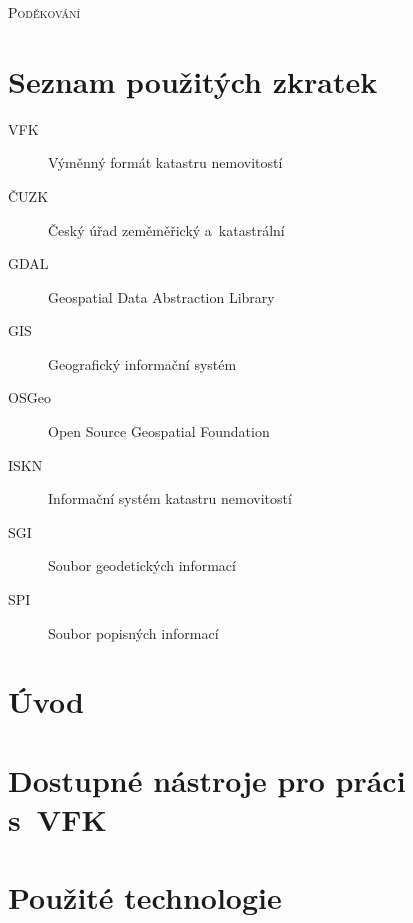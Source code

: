 \documentclass[a4paper,12pt,oneside]{book}
\begin{document}
\noindent
\textsc{\Large Poděkování}

\vspace{12pt}

\vspace{2cm}

\clearpage
\chapter*{Seznam použitých zkratek}
\thispagestyle{empty}

\begin{description}
\item[VFK] Výměnný formát katastru nemovitostí
\item[ČUZK] Český úřad zeměměřický a~katastrální
\item[GDAL] Geospatial Data Abstraction Library
\item[GIS] Geografický informační systém
\item[OSGeo] Open Source Geospatial Foundation
\item[ISKN] Informační systém katastru nemovitostí
\item[SGI] Soubor geodetických informací
\item[SPI] Soubor popisných informací
\end{description}


\clearpage
\rhead{{\rightmark}}		%
\tableofcontents
\thispagestyle{empty}

\clearpage
\pagestyle{fancy}		%
\setcounter{page}{1}   	%
\chapter*{Úvod}




\clearpage
\rhead{{\rightmark}}
\chapter{Dostupné nástroje pro práci s~VFK}


\clearpage
\chapter{Použité technologie}
\end{document}
